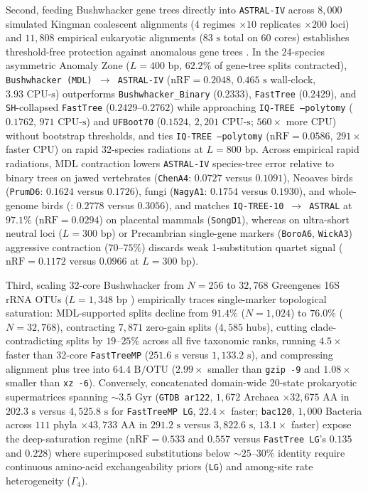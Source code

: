 \documentclass[11pt,a4paper]{article}
\begin{document}
Second, feeding Bushwhacker gene trees directly into \texttt{ASTRAL-IV} \citep{zhang2025aster} across $8,000$ simulated Kingman coalescent alignments ($4$ regimes $\times 10$ replicates $\times 200$ loci) and $11,808$ empirical eukaryotic alignments ($83\text{ s}$ total on 60 cores) establishes threshold-free protection against anomalous gene trees \citep{degnan2006discordance}. In the 24-species asymmetric Anomaly Zone ($L = 400\text{ bp}$, $62.2\%$ of gene-tree splits contracted), \texttt{Bushwhacker (MDL) $\to$ ASTRAL-IV} ($\text{nRF} = 0.2048$, $0.465\text{ s}$ wall-clock, $3.93\text{ CPU-s}$) outperforms \texttt{Bushwhacker\_Binary} ($0.2333$), \texttt{FastTree} ($0.2429$), and \texttt{SH}-collapsed \texttt{FastTree} ($0.2429\text{--}0.2762$) while approaching \texttt{IQ-TREE --polytomy} ($0.1762$, $971\text{ CPU-s}$) and \texttt{UFBoot70} ($0.1524$, $2,201\text{ CPU-s}$; $560\times$ more CPU) without bootstrap thresholds, and ties \texttt{IQ-TREE --polytomy} ($\text{nRF} = 0.0586$, $291\times$ faster CPU) on rapid 32-species radiations at $L = 800\text{ bp}$. Across empirical rapid radiations, MDL contraction lowers \texttt{ASTRAL-IV} species-tree error relative to binary trees on jawed vertebrates (\texttt{ChenA4}: $0.0727$ versus $0.1091$), Neoaves birds (\texttt{PrumD6}: $0.1624$ versus $0.1726$), fungi (\texttt{NagyA1}: $0.1754$ versus $0.1930$), and whole-genome birds (\citet{shultz2019widespread}: $0.2778$ versus $0.3056$), and matches \texttt{IQ-TREE-10 $\to$ ASTRAL} at $97.1\%$ ($\text{nRF} = 0.0294$) on placental mammals (\texttt{SongD1}), whereas on ultra-short neutral loci ($L = 300\text{ bp}$) or Precambrian single-gene markers (\texttt{BoroA6}, \texttt{WickA3}) aggressive contraction ($70\text{--}75\%$) discards weak 1-substitution quartet signal ($\text{nRF} = 0.1172$ versus $0.0966$ at $L = 300\text{ bp}$).

Third, scaling 32-core Bushwhacker from $N = 256$ to $32,768$ Greengenes 16S rRNA OTUs ($L = 1,348\text{ bp}$ \citep{mcdonald2012greengenes}) empirically traces single-marker topological saturation: MDL-supported splits decline from $91.4\%$ ($N = 1,024$) to $76.0\%$ ($N = 32,768$), contracting $7,871$ zero-gain splits ($4,585$ hubs), cutting clade-contradicting splits by $19\text{--}25\%$ across all five taxonomic ranks, running $4.5\times$ faster than 32-core \texttt{FastTreeMP} ($251.6\text{ s}$ versus $1,133.2\text{ s}$), and compressing alignment plus tree into $64.4\text{ B/OTU}$ ($2.99\times$ smaller than \texttt{gzip -9} and $1.08\times$ smaller than \texttt{xz -6}). Conversely, concatenated domain-wide 20-state prokaryotic supermatrices spanning $\sim 3.5\text{ Gyr}$ (\texttt{GTDB ar122}, $1,672$ Archaea $\times 32,675\text{ AA}$ in $202.3\text{ s}$ versus $4,525.8\text{ s}$ for \texttt{FastTreeMP LG}, $22.4\times$ faster; \texttt{bac120}, $1,000$ Bacteria across $111$ phyla $\times 43,733\text{ AA}$ in $291.2\text{ s}$ versus $3,822.6\text{ s}$, $13.1\times$ faster) expose the deep-saturation regime ($\text{nRF} = 0.533$ and $0.557$ versus \texttt{FastTree LG}'s $0.135$ and $0.228$) where superimposed substitutions below $\sim 25\text{--}30\%$ identity require continuous amino-acid exchangeability priors (\texttt{LG}) and among-site rate heterogeneity ($\Gamma_4$).
\end{document}
